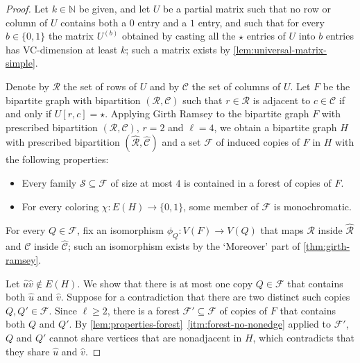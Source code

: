 \documentclass[11pt]{article}
\theoremstyle{remark}
\begin{document}
\begin{proof}
    Let $k \in \mathbb{N}$ be given, and let $U$ be a partial matrix such that no row or column of $U$ contains both a $0$ entry and a $1$ entry, and such that for every $b \in \{0, 1\}$ the matrix $U^{(b)}$ obtained by casting all the $\star$ entries of $U$ into $b$ entries has VC-dimension at least $k$; such a matrix exists by \cref{lem:universal-matrix-simple}.
    
    Denote by $\mathcal{R}$ the set of rows of $U$ and by $\mathcal{C}$ the set of columns of $U$.
    Let $F$ be the bipartite graph with bipartition $(\mathcal{R}, \mathcal{C})$ such that $r \in \mathcal{R}$ is adjacent to $c \in \mathcal{C}$ if and only if $U[r, c] = \star$.
    Applying Girth Ramsey to the bipartite graph $F$ with prescribed bipartition $(\mathcal{R}, \mathcal{C})$, $r = 2$ and $\ell = 4$, we obtain a bipartite graph $H$ with prescribed bipartition $(\widehat{\mathcal{R}}, \widehat{\mathcal{C}})$ and a set $\mathcal{F}$ of induced copies of $F$ in $H$ with the following properties: \begin{itemize}
        \item Every family $\mathcal{S} \subseteq \mathcal{F}$ of size at most $4$ is contained in a forest of copies of $F$.
        \item For every coloring $\chi : E(H) \to \{0, 1\}$, some member of $\mathcal{F}$ is monochromatic.
    \end{itemize}
    For every $Q \in \mathcal{F}$, fix an isomorphism $\phi_Q : V(F) \to V(Q)$ that maps $\mathcal{R}$ inside $\widehat{\mathcal{R}}$ and $\mathcal{C}$ inside $\widehat{\mathcal{C}}$; such an isomorphism exists by the `Moreover' part of \cref{thm:girth-ramsey}.
    
    Let $\widehat{u}\widehat{v} \notin E(H)$. 
    We show that there is at most one copy $Q \in \mathcal{F}$ that contains both $\widehat{u}$ and $\widehat{v}$.
    Suppose for a contradiction that there are two distinct such copies $Q, Q' \in \mathcal{F}$.
    Since $\ell \geq 2$, there is a forest $\mathcal{F}' \subseteq \mathcal{F}$ of copies of $F$ that contains both $Q$ and $Q'$.
    By \cref{lem:properties-forest}~\ref{itm:forest-no-nonedge} applied to $\mathcal{F'}$, $Q$ and $Q'$ cannot share vertices that are nonadjacent in $H$, which contradicts that they share $\widehat{u}$ and $\widehat{v}$.
    

\end{proof}
\end{document}
